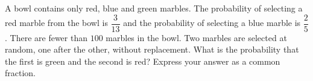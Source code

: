 A bowl contains only red, blue and green marbles. The probability of selecting a red marble from the bowl is $\dfrac{3}{13}$ and the probability of selecting a blue marble is $\dfrac{2}{5}$. There are fewer than $100$ marbles in the bowl. Two marbles are selected at random, one after the other, without replacement. What is the probability that the first is green and the second is red? Express your answer as a common fraction.
